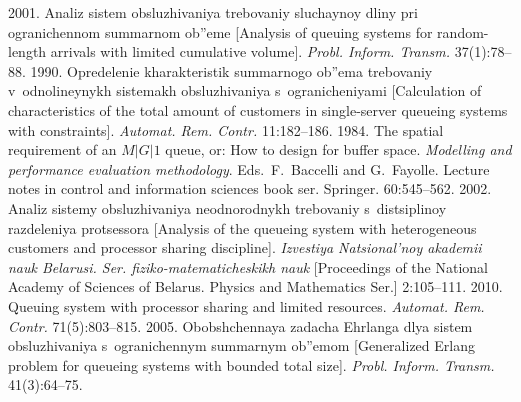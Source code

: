 \begin{multicols}{2}
{{\begin{thebibliography}{99}
 2001. Ana\-liz sistem obsluzhivaniya 
trebovaniy sluchaynoy dliny pri ogranichennom summarnom ob''eme 
[Analysis of queuing systems for random-length arrivals with limited cumulative volume].
\textit{Probl. Inform. Transm.} 37(1):78--88.
1990. Opredelenie kharakteristik summarnogo ob''ema trebovaniy 
v~odnolineynykh sistemakh obsluzhivaniya s~ogranicheniyami [Calculation 
of characteristics of the total amount of customers in single-server 
queueing systems with constraints]. \textit{Automat. Rem. Contr.} 11:182--186.
 1984. The spatial requirement of an $M|G|1$ queue, or: 
How to design for buffer space. 
\textit{Modelling and performance evaluation methodology}.
Eds.\ F.~Baccelli and G.~Fayolle. Lecture notes in control
and information sciences book ser. Springer. 60:545--562.
 2002. Analiz sistemy obsluzhivaniya neodnorodnykh 
trebovaniy s~distsiplinoy razdeleniya pro\-tses\-so\-ra [Analysis of the queueing 
system with heterogeneous customers and processor sharing discipline]. 
\textit{Izvestiya Natsional'noy akademii nauk Belarusi. 
Ser. fiziko-matematicheskikh nauk} [Proceedings of the National Academy 
of Sciences of Belarus. Physics and Mathematics Ser.] 2:105--111.
 2010. 
Queuing system with processor sharing and limited resources. 
\textit{Automat. Rem. Contr.} 71(5):803--815.
 2005. Obobshchennaya zadacha Ehrlanga dlya 
sistem obsluzhivaniya s~ogranichennym summarnym ob''emom 
[Generalized Erlang problem for queueing systems with bounded total size]. 
\textit{Probl. Inform. Transm.}
 41(3):64--75.


\end{thebibliography}}}
\end{multicols}
